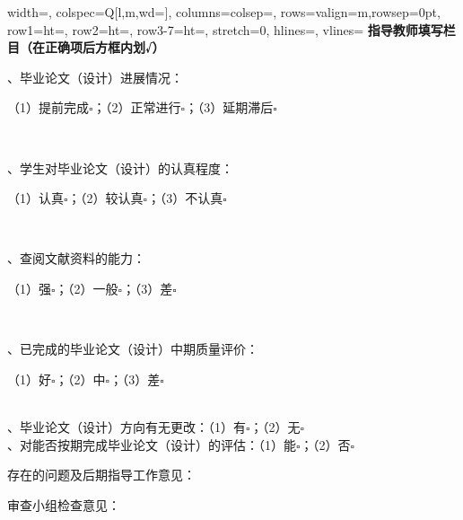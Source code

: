 \documentclass[UTF8,a4paper,fontset=none]{ctexart}
\newcommand{\TeacherHeader}[1]{{\songtiBold\bfseries\SZTUTeacherHeaderSize #1}}
\newcommand{\TeacherBody}[1]{{\songti\SZTUTeacherBodySize #1}}
\newcommand{\SignatureText}[1]{{\songti\SZTUSignatureSize #1}}
\begin{document}
\begin{adjustwidth}{-1.95mm}{-1.95mm}
\SZTUFormTightJoin
\noindent\begin{tblr}{
  width=\SZTUTableWidth,
  colspec={Q[l,m,wd=\SZTUTableContentWidth]},
  columns={colsep=\SZTUCellHorizontalPadding},
  rows={valign=m,rowsep=0pt},
  row{1}={ht=\SZTUTeacherHeaderHeight},
  row{2}={ht=\SZTUTeacherFirstHeight},
  row{3-7}={ht=\SZTUTeacherRowHeight},
  stretch=0,
  hlines={\SZTUFormRuleWidth},
  vlines={\SZTUFormRuleWidth}
}
  \TeacherHeader{指导教师填写栏目（在正确项后方框内划√）} \\
  \TeacherBody{1、毕业论文（设计）进展情况：\par（1）提前完成\(\square\)；\quad（2）正常进行\(\square\)；\quad（3）延期滞后\(\square\)} \\
  \TeacherBody{2、学生对毕业论文（设计）的认真程度：\par（1）认真\(\square\)；\quad（2）较认真\(\square\)；\quad（3）不认真\(\square\)} \\
  \TeacherBody{3、查阅文献资料的能力：\par（1）强\(\square\)；\quad（2）一般\(\square\)；\quad（3）差\(\square\)} \\
  \TeacherBody{4、已完成的毕业论文（设计）中期质量评价：\par（1）好\(\square\)；\quad（2）中\(\square\)；\quad（3）差\(\square\)} \\
  \TeacherBody{5、毕业论文（设计）方向有无更改：（1）有\(\square\)；\quad（2）无\(\square\)} \\
  \TeacherBody{6、对能否按期完成毕业论文（设计）的评估：（1）能\(\square\)；\quad（2）否\(\square\)} \\
\end{tblr}

\SZTUFormTightJoin
\begin{tcolorbox}[
  midtermfixed,
  height=\SZTUTeacherOpinionHeight,
  overlay unbroken and last={
    \node[anchor=south east,align=right] at ([xshift=-\SZTUSignatureRightInset,yshift=2mm]frame.south east) {
      \SignatureText{指导教师签名：\hspace*{\SZTUTeacherSignatureBlank}}\\[1mm]
      \SignatureText{年\hspace{6.35mm}月\hspace{6.35mm}日}
    };
  }
]
  \SignatureText{存在的问题及后期指导工作意见：}\par
\end{tcolorbox}

\SZTUFormTightJoin
\begin{tcolorbox}[
  midtermfixed,
  height=\SZTUReviewOpinionHeight,
  overlay unbroken and last={
    \node[anchor=south east,align=right] at ([xshift=-\SZTUSignatureRightInset,yshift=2mm]frame.south east) {
      \SignatureText{审查小组负责人签名：\hspace*{\SZTUReviewSignatureBlank}}\\[1mm]
      \SignatureText{年\hspace{6.35mm}月\hspace{6.35mm}日}
    };
  }
]
  \SignatureText{审查小组检查意见：}\par
\end{tcolorbox}
\end{adjustwidth}
\end{document}
